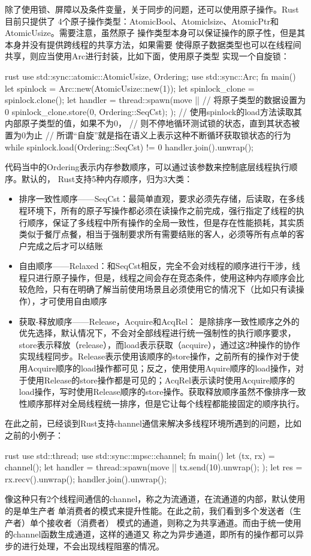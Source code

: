 除了使用锁、屏障以及条件变量，关于同步的问题，还可以使用原子操作。Rust目前只提供了
4个原子操作类型：AtomicBool、Atomiclsize、AtomicPtr和AtomicUsize。需要注意，虽然原子
操作类型本身可以保证操作的原子性，但是其本身并没有提供跨线程的共享方法，如果需要
使得原子数据类型也可以在线程间共享，则应当使用Arc进行封装，比如下面，使用原子类型
实现一个自旋锁：
\begin{code-block}{rust}
use std::sync::atomic::{AtomicUsize, Ordering};
use std::sync::Arc;
fn main() {
    let spinlock = Arc::new(AtomicUsize::new(1));
    let spinlock_clone = spinlock.clone();
    let handler = thread::spawn(move || {
        // 将原子类型的数据设置为0
        spinlock_clone.store(0, Ordering::SeqCst);
    });
    // 使用spinlock的load方法读取其内部原子类型的值，如果不为0，
    // 则不停地循环测试锁的状态，直到其状态被置为0为止
    // 所谓“自旋”就是指在语义上表示这种不断循环获取锁状态的行为
    while spinlock.load(Ordering::SeqCst) != 0 {}
    handler.join().unwrap();
}
\end{code-block}
代码当中的Ordering表示内存参数顺序，可以通过该参数来控制底层线程执行顺序。默认的，
Rust支持5种内存顺序，归为3大类：
\begin{itemize}
  \item 排序一致性顺序——SeqCst：最简单直观，要求必须先存储，后读取，在多线程环境下，所有的原子写操作都必须在读操作之前完成，强行指定了线程的执行顺序，保证了多线程中所有操作的全局一致性，但是存在性能损耗，其实质类似于餐厅点餐，相当于强制要求所有需要结账的客人，必须等所有点单的客户完成之后才可以结账
  \item 自由顺序——Relaxed：和SeqCst相反，完全不会对线程的顺序进行干涉，线程只进行原子操作，但是，线程之间会存在竞态条件，使用这种内存顺序会比较危险，只有在明确了解当前使用场景且必须使用它的情况下（比如只有读操作），才可使用自由顺序
  \item 获取-释放顺序——Release，Acquire和AcqRel： 是除排序一致性顺序之外的优先选择，默认情况下，不会对全部线程进行统一强制性的执行顺序要求，store表示释放（release），而load表示获取（acquire），通过这2种操作的协作实现线程同步。Release表示使用该顺序的store操作，之前所有的操作对于使用Acquire顺序的load操作都可见；反之，使用使用Aquire顺序的load操作，对于使用Release的store操作都是可见的；AcqRel表示读时使用Acquire顺序的load操作，写时使用Release顺序的store操作。获取释放顺序虽然不像排序一致性顺序那样对全局线程统一排序，但是它让每个线程都能接固定的顺序执行。
\end{itemize}

在此之前，已经谈到Rust支持channel通信来解决多线程环境所遇到的问题，比如之前的小例子：
\begin{code-block}{rust}
use std::thread;
use std::sync::mpsc::channel;
fn main() {
    let (tx, rx) = channel();
    let handler = thread::spawn(move || {
        tx.send(10).unwrap();
    });
    let res = rx.recv().unwrap();
    handler.join().unwrap();
}
\end{code-block}
像这种只有2个线程间通信的channel，称之为流通道，在流通道的内部，默认使用的是单生产者
单消费者的模式来提升性能。在此之前，我们看到多个发送者（生产者）单个接收者（消费者）
模式的通道，则称之为共享通道。而由于统一使用的channel函数生成通道，这样的通道又
称之为异步通道，即所有的操作都可以异步的进行处理，不会出现线程阻塞的情况。

